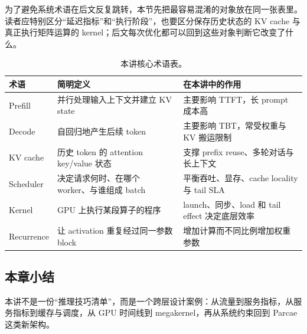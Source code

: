 为了避免系统术语在后文反复跳转，本节先把最容易混淆的对象放在同一张表里。读者应特别区分“延迟指标”和“执行阶段”，也要区分保存历史状态的 KV cache 与真正执行矩阵运算的 kernel；后文每次优化都可以回到这些对象判断它改变了什么。

\begin{table}[H]
\centering
\begin{tabular}{L{0.19\textwidth}L{0.29\textwidth}L{0.42\textwidth}}
\toprule
术语 & 简明定义 & 在本讲中的作用 \\
\midrule
Prefill & 并行处理输入上下文并建立 KV state & 主要影响 TTFT，长 prompt 成本高 \\
Decode & 自回归地产生后续 token & 主要影响 TBT，常受权重与 KV 搬运限制 \\
KV cache & 历史 token 的 attention key/value 状态 & 支撑 prefix reuse、多轮对话与长上下文 \\
Scheduler & 决定请求何时、在哪个 worker、与谁组成 batch & 平衡吞吐、显存、cache locality 与 tail SLA \\
Kernel & GPU 上执行某段算子的程序 & launch、同步、load 和 tail effect 决定底层效率 \\
Recurrence & 让 activation 重复经过同一参数 block & 增加计算而不同比例增加权重参数 \\
\bottomrule
\end{tabular}
\caption{本讲核心术语表。}
\end{table}

\subsection{本章小结}

本讲不是一份“推理技巧清单”，而是一个跨层设计案例：从流量到服务指标，从服务指标到缓存与调度，从 GPU 时间线到 megakernel，再从系统约束回到 Parcae 这类新架构。

